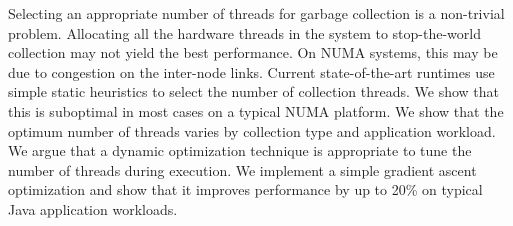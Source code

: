 Selecting an appropriate number of threads for garbage collection is
a non-trivial problem. Allocating all the hardware threads in the system to
stop-the-world collection may not yield the best performance. On NUMA 
systems, this may be due to congestion on the inter-node links.
Current state-of-the-art runtimes use simple static heuristics to 
select the number of collection threads. We show that this is suboptimal in most cases on a typical NUMA platform.
We show that the optimum number of threads varies by collection type and application workload. We argue that a dynamic optimization technique is appropriate
to tune the number of threads during execution.
We implement a simple gradient ascent optimization and show that it improves performance by up to 20\% on typical Java application workloads.
